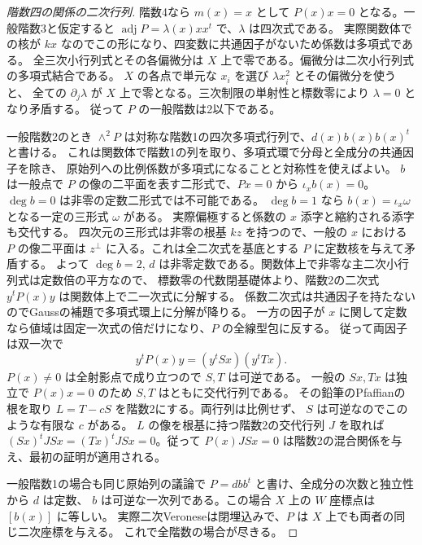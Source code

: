 \begin{proof}[階数四の関係の二次行列]
階数4なら $m(x)=x$ として $P(x)x=0$ となる。一般階数3と仮定すると
$\operatorname{adj} P=\lambda(x)xx^t$ で、$\lambda$ は四次式である。
実際関数体での核が $kx$ なのでこの形になり、四変数に共通因子がないため係数は多項式である。
全三次小行列式とその各偏微分は $X$ 上で零である。偏微分は二次小行列式の多項式結合である。
$X$ の各点で単元な $x_i$ を選び $\lambda x_i^2$ とその偏微分を使うと、
全ての $\partial_j\lambda$ が $X$ 上で零となる。三次制限の単射性と標数零により $\lambda=0$ となり矛盾する。
従って $P$ の一般階数は2以下である。

一般階数2のとき $\wedge^2 P$ は対称な階数1の四次多項式行列で、$d(x)b(x)b(x)^t$ と書ける。
これは関数体で階数1の列を取り、多項式環で分母と全成分の共通因子を除き、
原始列への比例係数が多項式になることと対称性を使えばよい。
$b$ は一般点で $P$ の像の二平面を表す二形式で、$P x=0$ から $\iota_x b(x)=0$。
$\deg b=0$ は非零の定数二形式では不可能である。
$\deg b=1$ なら $b(x)=\iota_x\omega$ となる一定の三形式 $\omega$ がある。
実際偏極すると係数の $x$ 添字と縮約される添字も交代する。
四次元の三形式は非零の根基 $kz$ を持つので、一般の $x$ における $P$ の像二平面は
$z^\perp$ に入る。これは全二次式を基底とする $P$ に定数核を与えて矛盾する。
よって $\deg b=2$, $d$ は非零定数である。関数体上で非零な主二次小行列式は定数倍の平方なので、
標数零の代数閉基礎体より、階数2の二次式 $y^t P(x)y$ は関数体上で二一次式に分解する。
係数二次式は共通因子を持たないのでGaussの補題で多項式環上に分解が降りる。
一方の因子が $x$ に関して定数なら値域は固定一次式の倍だけになり、$P$ の全線型包に反する。
従って両因子は双一次で
\[
 y^t P(x)y=(y^t Sx)(y^t Tx).
\]
$P(x)\ne0$ は全射影点で成り立つので $S,T$ は可逆である。
一般の $Sx,Tx$ は独立で $P(x)x=0$ のため $S,T$ はともに交代行列である。
その鉛筆のPfaffianの根を取り $L=T-cS$ を階数2にする。両行列は比例せず、
$S$ は可逆なのでこのような有限な $c$ がある。
$L$ の像を根基に持つ階数2の交代行列 $J$ を取れば
$(Sx)^tJSx=(Tx)^tJSx=0$。従って $P(x)JSx=0$ は階数2の混合関係を与え、最初の証明が適用される。

一般階数1の場合も同じ原始列の議論で $P=d b b^t$ と書け、全成分の次数と独立性から $d$ は定数、
$b$ は可逆な一次列である。この場合 $X$ 上の $W$ 座標点は $[b(x)]$ に等しい。
実際二次Veroneseは閉埋込みで、$P$ は $X$ 上でも両者の同じ二次座標を与える。
これで全階数の場合が尽きる。
\end{proof}
